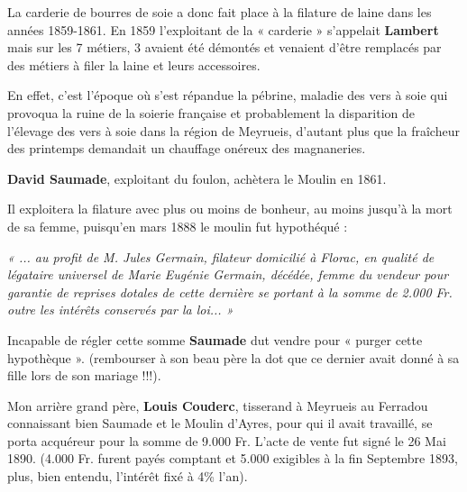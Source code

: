 \vspace{0.35cm}

La carderie de bourres de soie a donc fait place à la filature de laine dans les
années 1859-1861. En 1859 l’exploitant de la « carderie » s’appelait \textbf{Lambert}
mais sur les 7 métiers, 3 avaient été démontés et venaient d’être remplacés par
des métiers à filer la laine et leurs accessoires.

\vspace{0.35cm}

En effet, c’est l’époque où s’est répandue la pébrine, maladie des vers à soie qui
provoqua la ruine de la soierie française et probablement la disparition de
l’élevage des vers à soie dans la région de Meyrueis, d’autant plus que la
fraîcheur des printemps demandait un chauffage onéreux des magnaneries.

\vspace{0.35cm}

\textbf{David Saumade}, exploitant du foulon, achètera le Moulin en 1861.

\vspace{0.35cm}

Il exploitera la filature avec plus ou moins de bonheur, au moins jusqu’à la mort
de sa femme, puisqu’en mars 1888 le moulin fut hypothéqué :

\vspace{0.25cm}

\begin{flushleft}
\hspace{0.35cm}
\parbox{0.88\textwidth}{
\textit{
« ... au profit de M. Jules Germain, filateur domicilié à Florac, en qualité de
légataire universel de Marie Eugénie Germain, décédée, femme du vendeur
pour garantie de reprises dotales de cette dernière se portant à la somme de
2.000 Fr. outre les intérêts conservés par la loi... »
}
}
\end{flushleft}

\vspace{0.25cm}

Incapable de régler cette somme \textbf{Saumade} dut vendre pour « purger cette
hypothèque ». (rembourser à son beau père la dot que ce dernier avait donné à sa
fille lors de son mariage !!!).

Mon arrière grand père, \textbf{Louis Couderc}, tisserand à Meyrueis au Ferradou
connaissant bien Saumade et le Moulin d’Ayres, pour qui il avait travaillé, se
porta acquéreur pour la somme de 9.000 Fr. L’acte de vente fut signé le 26 Mai
1890. (4.000 Fr. furent payés comptant et 5.000 exigibles à la fin Septembre
1893, plus, bien entendu, l’intérêt fixé à 4\% l’an).

